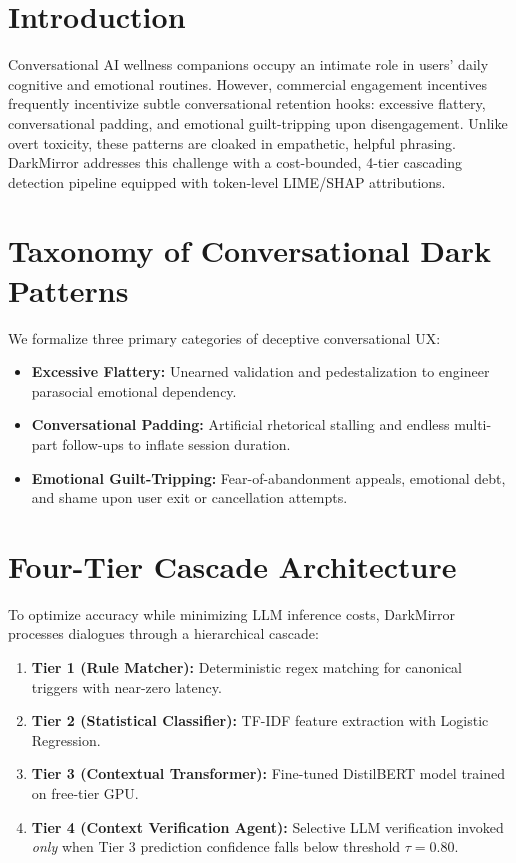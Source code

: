 \documentclass[10pt,journal,compsoc]{IEEEtran}
\begin{document}
\section{Introduction}
Conversational AI wellness companions occupy an intimate role in users' daily cognitive and emotional routines. However, commercial engagement incentives frequently incentivize subtle conversational retention hooks: excessive flattery, conversational padding, and emotional guilt-tripping upon disengagement. Unlike overt toxicity, these patterns are cloaked in empathetic, helpful phrasing. DarkMirror addresses this challenge with a cost-bounded, 4-tier cascading detection pipeline equipped with token-level LIME/SHAP attributions.

\section{Taxonomy of Conversational Dark Patterns}
We formalize three primary categories of deceptive conversational UX:
\begin{itemize}
    \item \textbf{Excessive Flattery:} Unearned validation and pedestalization to engineer parasocial emotional dependency.
    \item \textbf{Conversational Padding:} Artificial rhetorical stalling and endless multi-part follow-ups to inflate session duration.
    \item \textbf{Emotional Guilt-Tripping:} Fear-of-abandonment appeals, emotional debt, and shame upon user exit or cancellation attempts.
\end{itemize}

\section{Four-Tier Cascade Architecture}
To optimize accuracy while minimizing LLM inference costs, DarkMirror processes dialogues through a hierarchical cascade:
\begin{enumerate}
    \item \textbf{Tier 1 (Rule Matcher):} Deterministic regex matching for canonical triggers with near-zero latency.
    \item \textbf{Tier 2 (Statistical Classifier):} TF-IDF feature extraction with Logistic Regression.
    \item \textbf{Tier 3 (Contextual Transformer):} Fine-tuned DistilBERT model trained on free-tier GPU.
    \item \textbf{Tier 4 (Context Verification Agent):} Selective LLM verification invoked \textit{only} when Tier 3 prediction confidence falls below threshold $\tau = 0.80$.
\end{enumerate}
\end{document}
